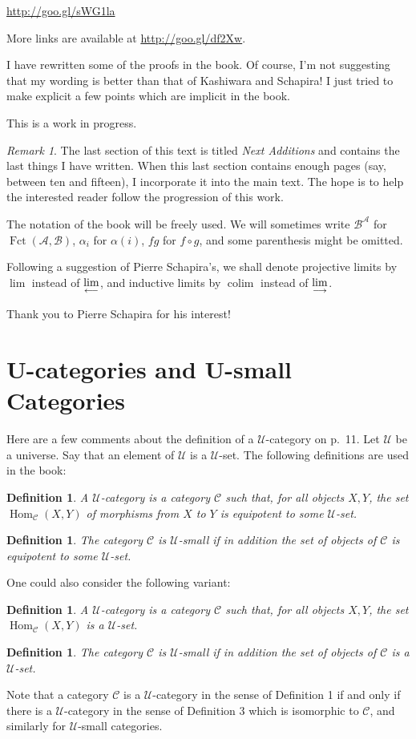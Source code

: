 \documentclass[12pt]{article}
\newtheorem{df}[thm]{Definition}%
\theoremstyle{remark}%
\newtheorem{rk}[thm]{Remark}
\newcommand{\n}{\noindent}
\newcommand{\A}{\mathcal A}
\newcommand{\B}{\mathcal B}
\newcommand{\C}{\mathcal C}
\newcommand{\U}{\mathcal U}
\newcommand{\ilim}{\operatornamewithlimits{\underset{\longrightarrow}{lim}}}
\newcommand{\plim}{\operatornamewithlimits{\underset{\longleftarrow}{lim}}}
\DeclareMathOperator*{\coli}{colim}
\DeclareMathOperator{\Fct}{Fct}
\DeclareMathOperator{\Hom}{Hom}
\begin{document}
\n\href{http://goo.gl/sWG1la}{http://goo.gl/sWG1la}

More links are available at \href{http://goo.gl/df2Xw}{http://goo.gl/df2Xw}.

I have rewritten some of the proofs in the book. Of course, I'm not suggesting that my wording is better than that of Kashiwara and Schapira! I just tried to make explicit a few points which are implicit in the book. 

This is a work in progress. %
%
\begin{rk}\label{next}
The last section of this text is titled {\em Next Additions} and contains the last things I have written. When this last section contains enough pages (say, between ten and fifteen), I incorporate it into the main text. The hope is to help the interested reader follow the progression of this work.
\end{rk}
%
The notation of the book will be freely used. We will sometimes write $\B^\A$ for $\Fct(\A,\B)$, $\alpha_i$ for $\alpha(i)$, $fg$ for $f\circ g$, and some parenthesis might be omitted. 

Following a suggestion of Pierre Schapira's, we shall denote projective limits by $\lim$ instead of $\plim$, and inductive limits by $\coli$ instead of $\ilim$. 

Thank you to Pierre Schapira for his interest!%
%
\section{U-categories and U-small Categories}\label{ucat}
% 
Here are a few comments about the definition of a $\U$-category on p.~11. Let $\U$ be a universe. Say that an element of $\U$ is a $\U$-set. The following definitions are used in the book: 
%
\begin{df} 
A $\U$-category is a category $\C$ such that, for all objects $X,Y$, the set $\Hom_\C(X,Y)$ of morphisms from $X$ to $Y$ is equipotent to some $\U$-set. 
\end{df} 
% 
\begin{df}
The category $\C$ is $\U$-small if in addition the set of objects of $\C$ is equipotent to some $\U$-set. 
\end{df} 
% 
One could also consider the following variant: 
% 
\begin{df}\label{ducat}
A $\U$-category is a category $\C$ such that, for all objects $X,Y$, the set $\Hom_\C(X,Y)$ is a $\U$-set. 
\end{df} 
% 
\begin{df}\label{small}
The category $\C$ is $\U$-small if in addition the set of objects of $\C$ is a $\U$-set. 
\end{df} 
% 
Note that a category $\C$ is a $\U$-category in the sense of Definition 1 if and only if there is a $\U$-category in the sense of Definition 3 which is isomorphic to $\C$, and similarly for $\U$-small categories.\bigskip
\end{document}
